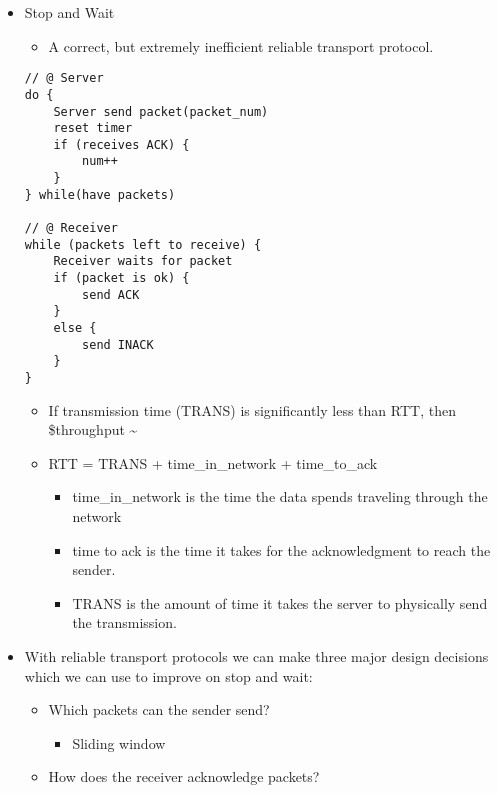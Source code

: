 \documentclass[]{article}
\providecommand{\tightlist}{%
  \setlength{\itemsep}{0pt}\setlength{\parskip}{0pt}}
\begin{document}
\begin{itemize}
\tightlist
\item
  Stop and Wait

  \begin{itemize}
  \tightlist
  \item
    A correct, but extremely inefficient reliable transport protocol.
  \end{itemize}

\begin{verbatim}
// @ Server
do {
    Server send packet(packet_num)
    reset timer
    if (receives ACK) {
        num++
    }
} while(have packets)

// @ Receiver 
while (packets left to receive) {
    Receiver waits for packet 
    if (packet is ok) {
        send ACK 
    }
    else {
        send INACK
    }
}
\end{verbatim}

  \begin{itemize}
  \tightlist
  \item
    If transmission time (TRANS) is significantly less than RTT, then
    \$throughput \textasciitilde{} 
  \item
    RTT = TRANS + time\_in\_network + time\_to\_ack

    \begin{itemize}
    \tightlist
    \item
      time\_in\_network is the time the data spends traveling through
      the network
    \item
      time to ack is the time it takes for the acknowledgment to reach
      the sender.
    \item
      TRANS is the amount of time it takes the server to physically send
      the transmission.
    \end{itemize}
  \end{itemize}
\item
  With reliable transport protocols we can make three major design
  decisions which we can use to improve on stop and wait:

  \begin{itemize}
  \tightlist
  \item
    Which packets can the sender send?

    \begin{itemize}
    \tightlist
    \item
      Sliding window
    \end{itemize}
  \item
    How does the receiver acknowledge packets?


\end{itemize}
\end{itemize}
\end{document}

